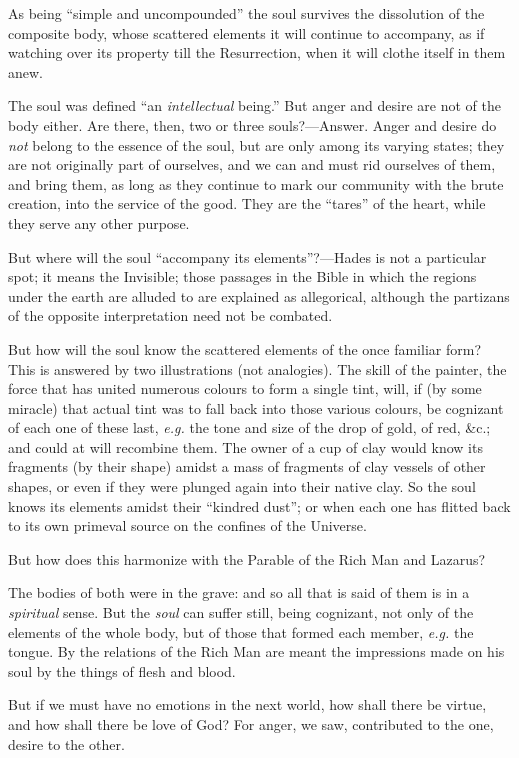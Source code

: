 As being “simple and uncompounded” the soul survives the dissolution of the composite body, whose scattered elements it will continue to accompany, as if watching over its property till the Resurrection, when it will clothe itself in them anew.

The soul was defined “an \emph{intellectual} being.” But anger and desire are not of the body either. Are there, then, two or three souls?—Answer. Anger and desire do \emph{not} belong to the essence of the soul, but are only among its varying states; they are not originally part of ourselves, and we can and must rid ourselves of them, and bring them, as long as they continue to mark our community with the brute creation, into the service of the good. They are the “tares” of the heart, while they serve any other purpose.

But where will the soul “accompany its elements”?—Hades is not a particular spot; it means the Invisible; those passages in the Bible in which the regions under the earth are alluded to are explained as allegorical, although the partizans of the opposite interpretation need not be combated.

But how will the soul know the scattered elements of the once familiar form? This is answered by two illustrations (not analogies). The skill of the painter, the force that has united numerous colours to form a single tint, will, if (by some miracle) that actual tint was to fall back into those various colours, be cognizant of each one of these last, \emph{e.g.} the tone and size of the drop of gold, of red, \&c.; and could at will recombine them. The owner of a cup of clay would know its fragments (by their shape) amidst a mass of fragments of clay vessels of other shapes, or even if they were plunged again into their native clay. So the soul knows its elements amidst their “kindred dust”; or when each one has flitted back to its own primeval source on the confines of the Universe.

But how does this harmonize with the Parable of the Rich Man and Lazarus?

The bodies of both were in the grave: and so all that is said of them is in a \emph{spiritual} sense. But the \emph{soul} can suffer still, being cognizant, not only of the elements of the whole body, but of those that formed each member, \emph{e.g.} the tongue. By the relations of the Rich Man are meant the impressions made on his soul by the things of flesh and blood.

But if we must have no emotions in the next world, how shall there be virtue, and how shall there be love of God? For anger, we saw, contributed to the one, desire to the other.

